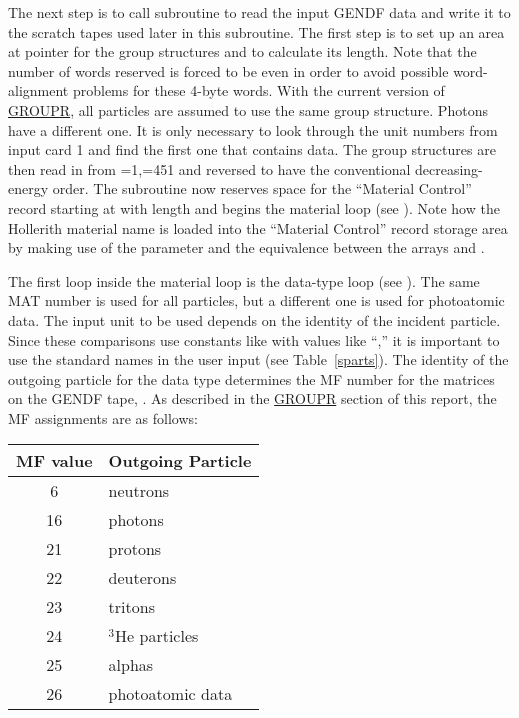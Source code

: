 The next step is to call subroutine
 to read the input
GENDF data and write it to the scratch tapes used later in this
subroutine.  The first step is to set up an area at pointer
 for the  group structures and to calculate
its length.  Note that the number of words reserved is forced to be
even in order to avoid possible word-alignment problems for these
4-byte words.  With the current version of
\hyperlink{sGROUPRhy}{GROUPR}, all particles are
assumed to use the same group structure.  Photons have a different one.
It is only necessary to look through the unit numbers from input card 1
and find the first one that contains data.  The group structures are
then read in from =1,=451 and reversed to have
the conventional decreasing-energy order.  The subroutine now
reserves space for the ``Material Control'' record starting at
 with length  and begins the material
loop (see ).
Note how the Hollerith material name is loaded into the ``Material Control''
record storage area by making use of the  parameter and
the equivalence between the arrays  and .

The first loop inside the material loop is the data-type loop (see
 ).  The same MAT number is used for
all particles,
but a different one is used for photoatomic data.  The input unit to
be used depends on the identity of the incident particle.  Since these
comparisons use constants like  with values like
``,'' it is important to use the standard names in
the user input (see Table~\ref{sparts}).  The identity of the
outgoing particle for the data type determines the MF number for
the matrices on the GENDF tape, .  As described in the
\hyperlink{sGROUPRhy}{GROUPR} section of this report,
the MF assignments are as follows:

\begin{center}
\begin{tabular}{cl}
MF value & Outgoing Particle \\ \hline
6 & neutrons \\
16 &  photons \\
21 & protons \\
22 & deuterons \\
23 & tritons \\
24 & $^3$He particles \\
25 & alphas \\
26 & photoatomic data \\ \hline
\end{tabular}
\end{center}

